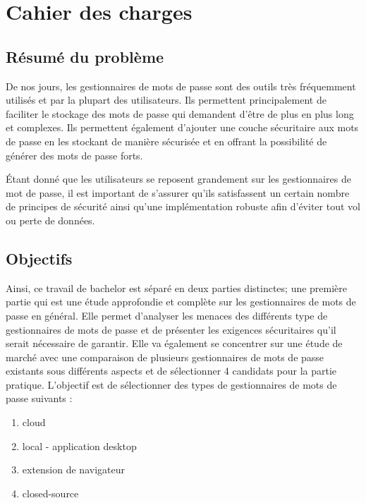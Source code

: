

\chapter{Cahier des charges}



\section*{Résumé du problème}
De nos jours, les gestionnaires de mots de passe sont des outils très fréquemment utilisés et par la plupart des utilisateurs. Ils permettent principalement de faciliter le stockage des mots de passe qui demandent d'être de plus en plus long et complexes. Ils permettent également d'ajouter une couche sécuritaire aux mots de passe en les stockant de manière sécurisée et en offrant la possibilité de générer des mots de passe forts.

Étant donné que les utilisateurs se reposent grandement sur les gestionnaires de mot de passe, il est important de s'assurer qu'ils satisfassent un certain nombre de principes de sécurité ainsi qu'une implémentation robuste afin d'éviter tout vol ou perte de données. 



\section*{Objectifs}
Ainsi, ce travail de bachelor est séparé en deux parties distinctes; une première partie qui est une étude approfondie et complète sur les gestionnaires de mots de passe en général. Elle permet d'analyser les menaces des différents type de gestionnaires de mots de passe et de présenter les exigences sécuritaires qu'il serait nécessaire de garantir. Elle va également se concentrer sur une étude de marché avec une comparaison de plusieurs gestionnaires de mots de passe existants sous différents aspects et de sélectionner 4 candidats pour la partie pratique. L'objectif est de sélectionner des types de gestionnaires de mots de passe suivants :
\begin{enumerate}
	\item cloud
	\item local - application desktop
	\item extension de navigateur
	\item closed-source
\end{enumerate}

